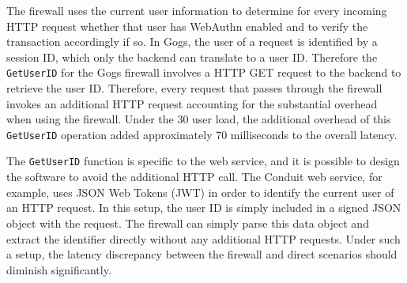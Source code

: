 The firewall uses the current user information to determine for every incoming HTTP request whether that user has WebAuthn enabled and to verify the transaction accordingly if so. In Gogs, the user of a request is identified by a session ID, which only the backend can translate to a user ID. Therefore the \lstinline{GetUserID} for the Gogs firewall involves a HTTP GET request to the backend to retrieve the user ID. Therefore, every request that passes through the firewall invokes an additional HTTP request accounting for the substantial overhead when using the firewall. Under the 30 user load, the additional overhead of this \lstinline{GetUserID} operation added approximately 70 milliseconds to the overall latency.

The \lstinline{GetUserID} function is specific to the web service, and it is possible to design the software to avoid the additional HTTP call. The Conduit web service, for example, uses JSON Web Tokens (JWT) in order to identify the current user of an HTTP request. In this setup, the user ID is simply included in a signed JSON object with the request. The firewall can simply parse this data object and extract the identifier directly without any additional HTTP requests. Under such a setup, the latency discrepancy between the firewall and direct scenarios should diminish significantly.




